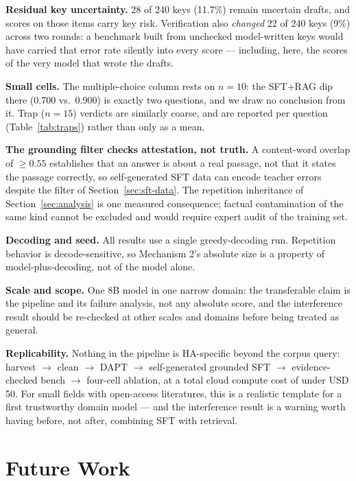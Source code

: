 \documentclass[11pt]{article}
\begin{document}
\textbf{Residual key uncertainty.} 28 of 240 keys (11.7\%) remain
uncertain drafts, and scores on those items carry key risk. Verification
also \emph{changed} 22 of 240 keys (9\%) across two rounds: a benchmark
built from unchecked model-written keys would have carried that error
rate silently into every score --- including, here, the scores of the
very model that wrote the drafts.

\textbf{Small cells.} The multiple-choice column rests on $n=10$: the
SFT+RAG dip there (0.700 vs.\ 0.900) is exactly two questions, and we draw
no conclusion from it. Trap ($n=15$) verdicts are similarly coarse, and
are reported per question (Table~\ref{tab:traps}) rather than
only as a mean.

\textbf{The grounding filter checks attestation, not truth.} A
content-word overlap of $\geq 0.55$ establishes that an answer is about a
real passage, not that it states the passage correctly, so self-generated
SFT data can encode teacher errors despite the filter of
Section~\ref{sec:sft-data}. The repetition inheritance of
Section~\ref{sec:analysis} is one measured consequence; factual
contamination of the same kind cannot be excluded and would require
expert audit of the training set.

\textbf{Decoding and seed.} All results use a single greedy-decoding run.
Repetition behavior is decode-sensitive, so Mechanism 2's absolute
size is a property of model-plus-decoding, not of the model alone.

\textbf{Scale and scope.} One 8B model in one narrow domain: the
transferable claim is the pipeline and its failure analysis, not any
absolute score, and the interference result should be re-checked at other
scales and domains before being treated as general.

\textbf{Replicability.} Nothing in the pipeline is HA-specific beyond the
corpus query: harvest $\rightarrow$ clean $\rightarrow$ DAPT $\rightarrow$
self-generated grounded SFT $\rightarrow$ evidence-checked bench
$\rightarrow$ four-cell ablation, at a total cloud compute cost of under
USD 50. For small
fields with open-access literatures, this is a realistic template for a
first trustworthy domain model --- and the interference result is a
warning worth having before, not after, combining SFT with retrieval.

\section{Future Work}
\label{sec:future}
\end{document}
